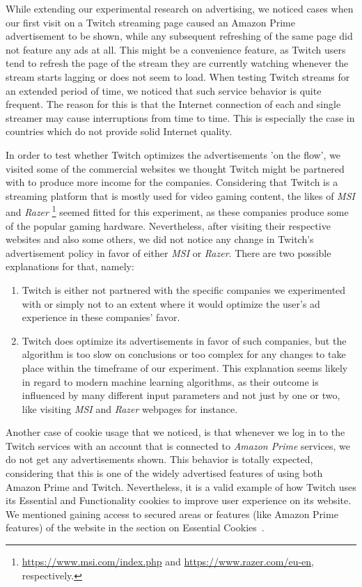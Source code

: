 While extending our experimental research on advertising, we noticed cases when our first visit on a Twitch streaming page caused an Amazon Prime advertisement to be shown, while any subsequent refreshing of the same page did not feature any ads at all. This might be a convenience feature, as Twitch users tend to refresh the page of the stream they are currently watching whenever the stream starts lagging or does not seem to load. When testing Twitch streams for an extended period of time, we noticed that such service behavior is quite frequent. The reason for this is that the Internet connection of each and single streamer may cause interruptions from time to time. This is especially the case in countries which do not provide solid Internet quality. 

In order to test whether Twitch optimizes the advertisements 'on the flow', we visited some of the commercial websites we thought Twitch might be partnered with to produce more income for the companies. Considering that Twitch is a streaming platform that is mostly used for video gaming content, the likes of \textit{MSI} and \textit{Razer} \footnote{\url{https://www.msi.com/index.php} and \url{https://www.razer.com/eu-en}, respectively.} seemed fitted for this experiment, as these companies produce some of the popular gaming hardware. Nevertheless, after visiting their respective websites and also some others, we did not notice any change in Twitch's advertisement policy in favor of either \textit{MSI} or \textit{Razer}. There are two possible explanations for that, namely: 
\begin{enumerate}
	\item Twitch is either not partnered with the specific companies we experimented with or simply not to an extent where it would optimize the user's ad experience in these companies' favor. 
	\item Twitch does optimize its advertisements in favor of such companies, but the algorithm is too slow on conclusions or too complex for any changes to take place within the timeframe of our experiment. This explanation seems likely in regard to modern machine learning algorithms, as their outcome is influenced by many different input parameters and not just by one or two, like visiting \textit{MSI} and \textit{Razer} webpages for instance. 
\end{enumerate}

Another case of cookie usage that we noticed, is that whenever we log in to the Twitch services with an account that is connected to \textit{Amazon Prime} services, we do not get any advertisements shown. This behavior is totally expected, considering that this is one of the widely advertised features of using both Amazon Prime and Twitch. Nevertheless, it is a valid example of how Twitch uses its Essential and Functionality cookies to improve user experience on its website. We mentioned gaining access to secured areas or features (like Amazon Prime features) of the website in the section on Essential Cookies~. 

